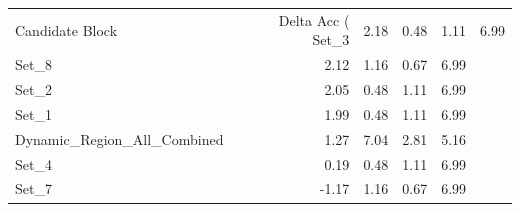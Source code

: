 \begin{tabular}{lrrrr}
\toprule
Candidate Block & Delta Acc (%
\midrule
Set_3 & 2.18 & 0.48 & 1.11 & 6.99 \\
Set_8 & 2.12 & 1.16 & 0.67 & 6.99 \\
Set_2 & 2.05 & 0.48 & 1.11 & 6.99 \\
Set_1 & 1.99 & 0.48 & 1.11 & 6.99 \\
Dynamic_Region_All_Combined & 1.27 & 7.04 & 2.81 & 5.16 \\
Set_4 & 0.19 & 0.48 & 1.11 & 6.99 \\
Set_7 & -1.17 & 1.16 & 0.67 & 6.99 \\
\bottomrule
\end{tabular}
